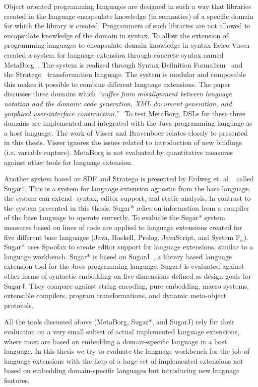 Object oriented programming languages are designed in such a way that libraries created in the language encapsulate knowledge (in semantics) of a specific domain for which the library is created. Programmers of such libraries are not allowed to encapsulate knowledge of the domain in syntax. To allow the extension of programming languages to encapsulate domain knowledge in syntax Eelco Visser created a system for language extension through concrete syntax named MetaBorg~\cite{Bravenboer2004}. The system is realized through Syntax Definition Formalism~\cite{Heering1989} and the Stratego~\cite{Visser2001a} transformation language. The system is modular and composable this makes it possible to combine different language extensions. The paper discusses three domains which \textit{``suffer from misalignment between language notation and the domain: code generation, XML document generation, and graphical user-interface construction.''}~\cite{Visser20024} To test MetaBorg, DSLs for these three domains are implemented and integrated with the Java programming language as a host language. The work of Visser and Bravenboer relates closely to \projectname presented in this thesis. Visser ignores the issues related to introduction of new bindings (i.e. variable capture). MetaBorg is not evaluated by quantitative measures against other tools for language extension.

Another system based on SDF and Stratego is presented by Erdweg et. al.~\cite{Erdweg} called Sugar*. This is a system for language extension agnostic from the base language, the system can extend- syntax, editor support, and static analysis. In contrast to the system presented in this thesis, Sugar* relies on information from a compiler of the base language to operate correctly. To evaluate the Sugar* system measures based on lines of code are applied to language extensions created for five different base languages (Java, Haskell, Prolog, JavaScript, and System F$_{\omega}$). Sugar* uses Spoofax to create editor support for language extensions, similar to a language workbench. Sugar* is based on SugarJ~\cite{Erdweg2011}, a library based language extension tool for the Java programming language. SugarJ is evaluated against other forms of syntactic embedding on five dimensions defined as design goals for SugarJ. They compare against string encoding, pure embedding, macro systems, extensible compilers, program transformations, and dynamic meta-object protocols.

All the tools discussed above (MetaBorg, Sugar*, and SugarJ) rely for their evaluation on a very small subset of actual implemented language extensions, where most are based on embedding a domain-specific language in a host language. In this thesis we try to evaluate the language workbench for the job of language extensions with the help of a large set of implemented extensions not based on embedding domain-specific languages but introducing new language features.  

